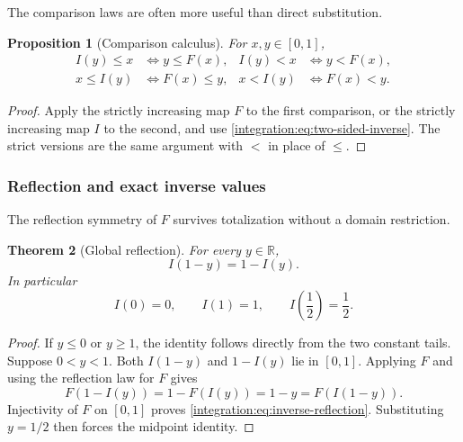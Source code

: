 \documentclass[11pt,oneside]{article}
\newtheorem{theorem}{Theorem}[section]
\newtheorem{proposition}[theorem]{Proposition}
\theoremstyle{definition}
\theoremstyle{remark}
\newcommand{\R}{\mathbb R}
\begin{document}
The comparison laws are often more useful than direct substitution.

\begin{proposition}[Comparison calculus]
\label{integration:prop:inverse-comparison}
For $x,y\in[0,1]$,
\begin{align}
 I(y)\le x &\iff y\le F(x),
 & I(y)<x &\iff y<F(x),                                    \label{integration:eq:I-left-compare}\\
 x\le I(y) &\iff F(x)\le y,
 & x<I(y) &\iff F(x)<y.                                    \label{integration:eq:I-right-compare}
\end{align}
\end{proposition}

\begin{proof}
Apply the strictly increasing map $F$ to the first comparison, or the strictly increasing map
$I$ to the second, and use \eqref{integration:eq:two-sided-inverse}.  The strict versions are the same
argument with $<$ in place of $\le$.
\end{proof}

\subsubsection{Reflection and exact inverse values}

The reflection symmetry of $F$ survives totalization without a domain restriction.

\begin{theorem}[Global reflection]
\label{integration:thm:inverse-reflection}
For every $y\in\R$,
\begin{equation}
 I(1-y)=1-I(y).
 \label{integration:eq:inverse-reflection}
\end{equation}
In particular
\begin{equation}
 I(0)=0,
 \qquad
 I(1)=1,
 \qquad
 I\!\left(\frac12\right)=\frac12.
 \label{integration:eq:inverse-basic-values}
\end{equation}
\end{theorem}

\begin{proof}
If $y\le0$ or $y\ge1$, the identity follows directly from the two constant tails.  Suppose
$0<y<1$.  Both $I(1-y)$ and $1-I(y)$ lie in $[0,1]$.  Applying $F$ and using the reflection
law for $F$ gives
\[
 F(1-I(y))=1-F(I(y))=1-y=F(I(1-y)).
\]
Injectivity of $F$ on $[0,1]$ proves \eqref{integration:eq:inverse-reflection}.  Substituting
$y=1/2$ then forces the midpoint identity.
\end{proof}
\end{document}
